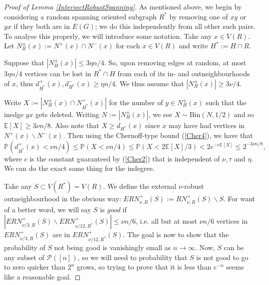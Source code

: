 \documentclass[10pt,letterpaper, reqno]{amsart}
\theoremstyle{definition}
\numberwithin{equation}{section}
\begin{document}
\begin{proof}[Proof of Lemma \ref{IntersectRobustSpanning}]
	As mentioned above, we begin by considering a random spanning oriented subgraph $R^*$ by removing one of $xy$ or $yx$ if they both are in $E(G)$; we do this independently from all other such pairs. To analyse this properly, we will introduce some notation. Take any $x \in V(R)$. Let $N^\pm_R(x) := N^+(x) \cap N^-(x)$ for each $ x \in V(R)$ and write $H^* := H \cap R$. 
	
	Suppose that $|N^\pm_{H}(x)| \leq 3\eta n/4$. So, upon removing edges at random, at most $3\eta n /4$ vertices can be lost in $R^* \cap H$ from each of its in- and outneighbourhoods of $x$, thus $d_{H^*}^+(x), d^-_{H^*}(x) \geq \eta n /4$. We thus assume that $|N^\pm_H(x)| \geq 3\nu/4$. 
	
	Write $X := |N^\pm_H(x)\cap N^+_{H^*}(x)|$ for the number of $y \in N^\pm_H(x)$ such that the inedge $yx$ gets deleted. Writing $N:=|N^\pm_H(x)|$, we see $X \sim \text{Bin}(N,1/2)$ and so $\mathbb{E}[X] \geq 3\nu n /8$. Also note that $X \geq d_{H^*}(x)$ since $x$ may have had vertices in $N^+(x) \backslash N^-(x)$. Then using the Chernoff-type bound (\ref{Cher4}), we have that 
	$$ \mathbb{P}(d^+_{H^*}(x) < \nu n/4) \leq \mathbb{P}(X < \nu n/4) \leq \mathbb{P}(X < 2 \mathbb{E}[X]/3) < 2e^{-c\mathbb{E}[X]} \leq 2^{-3\nu n/8},$$
	where $c$ is the constant guaranteed by (\ref{Cher2}) that is independent of $\nu,\tau $ and $\eta$. We can do the exact same thing for the indegree. 
	
	Take any $S \subset V(R^*) = V(R)$. We define the external $\nu$-robust outneighbourhood in the obvious way: $ERN_{\nu,R}^+(S) := RN_{\nu,R}^+(S) \backslash S$. For want of a better word, we will say $S$ is \textit{good} if  $|ERN_{\nu/3,R}^+(S) \backslash ERN_{\nu/12,R^*}^+(S)| \leq \nu n/6$, i.e. all but at most $\nu n/6$ vertices in $ERN_{\nu/3,R}^+(S)$ are in $ERN^+_{\nu/12, R^*}(S)$. The goal is now to show that the probability of $S$ not being good is vanishingly small as $n \to \infty$. Now, $S$ can be any subset of $\mathcal{P}([n])$, so we will need to probability that $S$ is not good to go to zero quicker than $2^n$ grows, so trying to prove that it is less than $e^{-n}$ seems like a reasonable goal.
	

\end{proof}
\end{document}
